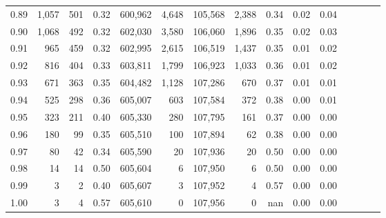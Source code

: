 \begin{tabular}{rrrcrrrrrrrrrrr}
0.89 &   1,057 &    501 &                                       0.32 &  600,962 &    4,648 &  105,568 &    2,388 &  0.34 &  0.02 &                         0.04 \\
0.90 &   1,068 &    492 &                                       0.32 &  602,030 &    3,580 &  106,060 &    1,896 &  0.35 &  0.02 &                         0.03 \\
0.91 &     965 &    459 &                                       0.32 &  602,995 &    2,615 &  106,519 &    1,437 &  0.35 &  0.01 &                         0.02 \\
0.92 &     816 &    404 &                                       0.33 &  603,811 &    1,799 &  106,923 &    1,033 &  0.36 &  0.01 &                         0.02 \\
0.93 &     671 &    363 &                                       0.35 &  604,482 &    1,128 &  107,286 &      670 &  0.37 &  0.01 &                         0.01 \\
0.94 &     525 &    298 &                                       0.36 &  605,007 &      603 &  107,584 &      372 &  0.38 &  0.00 &                         0.01 \\
0.95 &     323 &    211 &                                       0.40 &  605,330 &      280 &  107,795 &      161 &  0.37 &  0.00 &                         0.00 \\
0.96 &     180 &     99 &                                       0.35 &  605,510 &      100 &  107,894 &       62 &  0.38 &  0.00 &                         0.00 \\
0.97 &      80 &     42 &                                       0.34 &  605,590 &       20 &  107,936 &       20 &  0.50 &  0.00 &                         0.00 \\
0.98 &      14 &     14 &                                       0.50 &  605,604 &        6 &  107,950 &        6 &  0.50 &  0.00 &                         0.00 \\
0.99 &       3 &      2 &                                       0.40 &  605,607 &        3 &  107,952 &        4 &  0.57 &  0.00 &                         0.00 \\
1.00 &       3 &      4 &                                       0.57 &  605,610 &        0 &  107,956 &        0 &   nan &  0.00 &                         0.00 \\
\bottomrule
\end{tabular}
